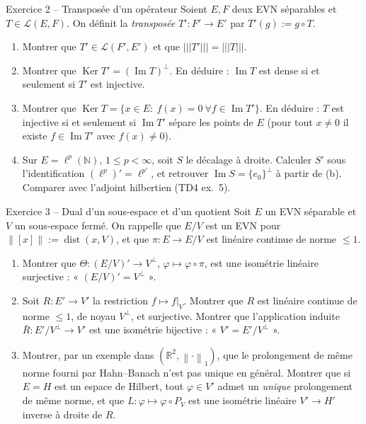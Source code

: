 \documentclass[11pt,a4paper]{article}
\newcommand{\R}{\mathbb{R}}
\newcommand{\N}{\mathbb{N}}
\newcommand{\dist}{\operatorname{dist}}
\newcommand{\norm}[1]{\left\|#1\right\|}
\newcommand{\opnorm}[1]{|\!|\!|#1|\!|\!|}
\newcommand{\Lc}{\mathcal{L}}
\DeclareMathOperator{\Ker}{Ker}
\DeclareMathOperator{\Ima}{Im}
\theoremstyle{definition}
\begin{document}
\begin{exo}{Exercice 2 -- Transposée d'un opérateur}
Soient $E,F$ deux EVN séparables et $T\in\Lc(E,F)$. On définit la \emph{transposée} $T':F'\to E'$ par $T'(g):=g\circ T$.
\begin{enumerate}[label=(\alph*)]
  \item Montrer que $T'\in\Lc(F',E')$ et que $\opnorm{T'}=\opnorm T$.
  \item Montrer que $\Ker T'=(\Ima T)^\perp$. En déduire : $\Ima T$ est dense si et seulement si $T'$ est injective.
  \item Montrer que $\Ker T=\{x\in E:\ f(x)=0\ \forall f\in\Ima T'\}$. En déduire : $T$ est injective si et seulement si $\Ima T'$ sépare les points de $E$ (pour tout $x\ne0$ il existe $f\in\Ima T'$ avec $f(x)\ne0$).
  \item Sur $E=\ell^p(\N)$, $1\le p<\infty$, soit $S$ le décalage à droite. Calculer $S'$ sous l'identification $(\ell^p)'=\ell^{p'}$, et retrouver $\Ima S=\{e_0\}^{\perp}$ à partir de (b). Comparer avec l'adjoint hilbertien (TD4 ex.~5).
\end{enumerate}
\end{exo}

\begin{exo}{Exercice 3 -- Dual d'un sous-espace et d'un quotient}
Soit $E$ un EVN séparable et $V$ un sous-espace fermé. On rappelle que $E/V$ est un EVN pour $\norm{[x]}:=\dist(x,V)$, et que $\pi:E\to E/V$ est linéaire continue de norme $\le1$.
\begin{enumerate}[label=(\alph*)]
  \item Montrer que $\Theta:(E/V)'\to V^\perp$, $\varphi\mapsto\varphi\circ\pi$, est une isométrie linéaire surjective : « $(E/V)'=V^\perp$ ».
  \item Soit $R:E'\to V'$ la restriction $f\mapsto f|_V$. Montrer que $R$ est linéaire continue de norme $\le1$, de noyau $V^\perp$, et surjective. Montrer que l'application induite $\bar R:E'/V^\perp\to V'$ est une isométrie bijective : « $V'=E'/V^\perp$ ».
  \item Montrer, par un exemple dans $(\R^2,\norm\cdot_1)$, que le prolongement de même norme fourni par Hahn--Banach n'est pas unique en général. Montrer que si $E=H$ est un espace de Hilbert, tout $\varphi\in V'$ admet un \emph{unique} prolongement de même norme, et que $L:\varphi\mapsto\varphi\circ P_V$ est une isométrie linéaire $V'\to H'$ inverse à droite de $R$.
\end{enumerate}
\end{exo}
\end{document}
